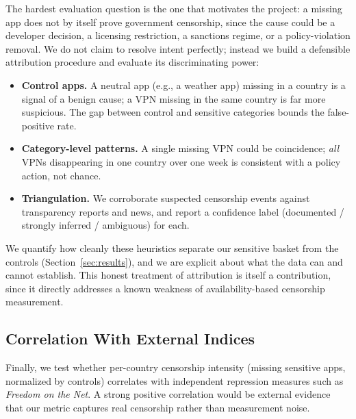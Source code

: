 The hardest evaluation question is the one that motivates the project: a missing
app does not by itself prove government censorship, since the cause could be a
developer decision, a licensing restriction, a sanctions regime, or a
policy-violation removal. We do not claim to resolve intent perfectly; instead we
build a defensible attribution procedure and evaluate its discriminating power:
\begin{itemize}
  \item \textbf{Control apps.} A neutral app (e.g., a weather app) missing in a
  country is a signal of a benign cause; a VPN missing in the same country is far
  more suspicious. The gap between control and sensitive categories bounds the
  false-positive rate.
  \item \textbf{Category-level patterns.} A single missing VPN could be
  coincidence; \emph{all} VPNs disappearing in one country over one week is
  consistent with a policy action, not chance.
  \item \textbf{Triangulation.} We corroborate suspected censorship events against
  transparency reports and news, and report a confidence label (documented /
  strongly inferred / ambiguous) for each.
\end{itemize}
We quantify how cleanly these heuristics separate our sensitive basket from the
controls (Section~\ref{sec:results}), and we are explicit about what the data can
and cannot establish. This honest treatment of attribution is itself a
contribution, since it directly addresses a known weakness of availability-based
censorship measurement.

\subsection{Correlation With External Indices}

Finally, we test whether per-country censorship intensity (missing sensitive apps,
normalized by controls) correlates with independent repression measures such as
\emph{Freedom on the Net}. A strong positive correlation would be external
evidence that our metric captures real censorship rather than measurement noise.
